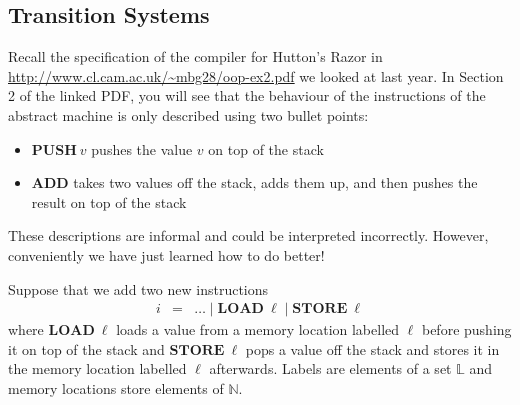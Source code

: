 \documentclass[10pt,a4paper]{exam}
\begin{document}
\begin{questions}

\section*{Transition Systems}

\question Recall the specification of the compiler for Hutton's Razor in \url{http://www.cl.cam.ac.uk/~mbg28/oop-ex2.pdf} we looked at last year. In Section 2 of the linked PDF, you will see that the behaviour of the instructions of the abstract machine is only described using two bullet points:
\begin{itemize}
\item $\mathbf{PUSH}~v$ pushes the value $v$ on top of the stack
\item $\mathbf{ADD}$ takes two values off the stack, adds them up, and then pushes the result on top of the stack
\end{itemize}
These descriptions are informal and could be interpreted incorrectly. However, conveniently we have just learned how to do better! 
\question Suppose that we add two new instructions
\begin{displaymath}
\begin{array}{lcl}
i & = & \ldots \mid \mathbf{LOAD}~\ell \mid \mathbf{STORE}~\ell
\end{array}
\end{displaymath}
where $\mathbf{LOAD}~\ell$ loads a value from a memory location labelled $\ell$ before pushing it on top of the stack and $\mathbf{STORE}~\ell$ pops a value off the stack and stores it in the memory location labelled $\ell$ afterwards. Labels are elements of a set $\mathbb{L}$ and memory locations store elements of $\mathbb{N}$.
\begin{parts}

\end{parts}
\end{questions}
\end{document}
